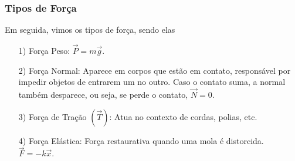 \documentclass[physics_notes.tex]{subfiles}
\begin{document}
\subsubsection{Tipos de Força}
Em seguida, vimos os tipos de força, sendo elas
\begin{itemize}
	\item[1)] Força Peso: $\vec{P} = m \vec{g}.$
	\item[2)] Força Normal: Aparece em corpos que estão em contato, responsável por impedir objetos de entrarem um no outro.
	      Caso o contato suma, a normal também desparece, ou seja, se perde o contato, $\vec{N} = 0.$
	\item[3)] Força de Tração $(\vec{T})$: Atua no contexto de cordas, polias, etc.
	\item[4)] Força Elástica: Força restaurativa quando uma mola é distorcida. $\vec{F} = -k \vec{x}.$
\end{itemize}
\end{document}
